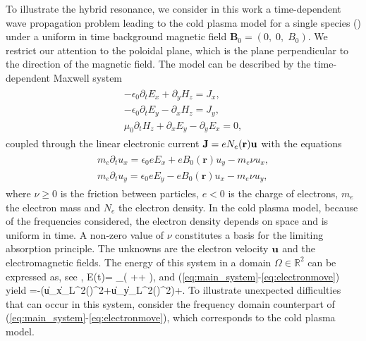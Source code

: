 To illustrate the hybrid resonance, we consider in this work a %
 time-dependent wave propagation problem leading to the cold plasma model for a single species () 
under a uniform in time background magnetic field $\mathbf{B}_0=(0,\;0,\; B_0)$. 
We restrict our attention to the poloidal plane, which is the plane 
perpendicular to the direction of the magnetic field. The model can be described by the time-dependent Maxwell system  \cite{Stix}
\begin{align}
\label{eq:main_system}
\begin{split}
-\epsilon_0 \partial_t E_x +\partial_y H_z = J_x,\\
-\epsilon_0 \partial_t E_y -\partial_x H_z = J_y,\\
\mu_0 \partial_t H_z + \partial_x E_y-\partial_y E_x= 0,
\end{split}
\end{align}
coupled through the linear electronic current  ${\bf J} = eN_e(\mathbf{r}) {\bf u}$
 with the equations 
 \begin{align}
\begin{split}
\label{eq:electronmove}
m_e \partial_t u_x =\epsilon_0 e E_x+e B_0(\mathbf{r}) u_y -m_e \nu u_x,\\
m_e \partial_t u_y =\epsilon_0 e E_y-e B_0(\mathbf{r}) u_x -m_e \nu u_y,
\end{split}
\end{align}
where $\nu\geq 0$ is the friction  between particles, $e<0$ is the charge of electrons, $m_e$ the electron mass and $N_e$ the electron density. In the cold plasma model, because of the frequencies considered, the electron density 
depends on space and is uniform in time. A non-zero value of $\nu$ constitutes a basis for the limiting absorption principle. 
The unknowns are the electron velocity ${\bf u}$ and the electromagnetic fields. 
The energy of this system in a domain $\Omega\in\mathbb R^2$ can be expressed as, see \cite{Despres_2014},
\ben
{\mathcal E}(t)= \int_\Omega \left(
++ 
\right),
\een
and (\ref{eq:main_system}-\ref{eq:electronmove}) yield
\ben
{}=-\nu\left(\|u_{x}\|_{L^{2}(\Omega)}^2+\|u_{y}\|_{L^{2}(\Omega)}^2\right)+.
\een
To illustrate unexpected difficulties that can occur in this system, consider the frequency domain counterpart of (\ref{eq:main_system}-\ref{eq:electronmove}), which corresponds to the cold plasma model. 
